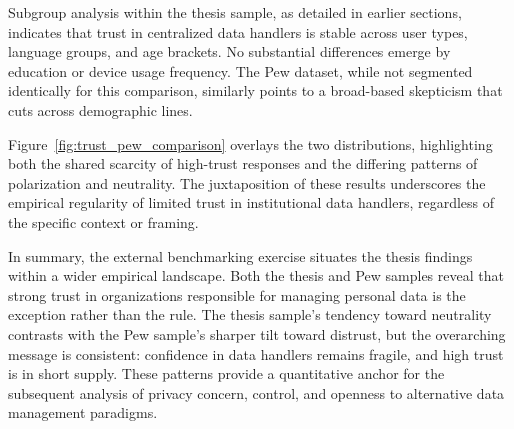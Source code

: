		Subgroup analysis within the thesis sample, as detailed in earlier sections, indicates that trust in centralized data handlers is stable across user types, language groups, and age brackets. No substantial differences emerge by education or device usage frequency. The Pew dataset, while not segmented identically for this comparison, similarly points to a broad-based skepticism that cuts across demographic lines.
		
		Figure~\ref{fig:trust_pew_comparison} overlays the two distributions, highlighting both the shared scarcity of high-trust responses and the differing patterns of polarization and neutrality. The juxtaposition of these results underscores the empirical regularity of limited trust in institutional data handlers, regardless of the specific context or framing.
		
		In summary, the external benchmarking exercise situates the thesis findings within a wider empirical landscape. Both the thesis and Pew samples reveal that strong trust in organizations responsible for managing personal data is the exception rather than the rule. The thesis sample’s tendency toward neutrality contrasts with the Pew sample’s sharper tilt toward distrust, but the overarching message is consistent: confidence in data handlers remains fragile, and high trust is in short supply. These patterns provide a quantitative anchor for the subsequent analysis of privacy concern, control, and openness to alternative data management paradigms.
